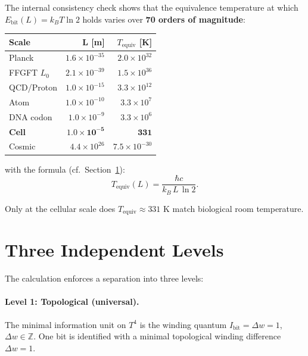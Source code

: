 The internal consistency check shows that the equivalence temperature
at which \(E_\text{bit}(L) = k_B T \ln 2\) holds
varies over \textbf{70 orders of magnitude}:

\begin{center}
\renewcommand{\arraystretch}{1.4}
\begin{tabular}{lrr}
\toprule
\textbf{Scale} & \textbf{L [m]} & \textbf{\(T_\text{equiv}\) [K]} \\
\midrule
Planck         & \(1.6 \times 10^{-35}\) & \(2.0 \times 10^{32}\) \\
FFGFT \(L_0\)  & \(2.1 \times 10^{-39}\) & \(1.5 \times 10^{36}\) \\
QCD/Proton     & \(1.0 \times 10^{-15}\) & \(3.3 \times 10^{12}\) \\
Atom           & \(1.0 \times 10^{-10}\) & \(3.3 \times 10^{7}\)  \\
DNA codon      & \(1.0 \times 10^{-9}\)  & \(3.3 \times 10^{6}\)  \\
\textbf{Cell}  & \(\mathbf{1.0 \times 10^{-5}}\) & \(\mathbf{331}\) \\
Cosmic         & \(4.4 \times 10^{26}\) & \(7.5 \times 10^{-30}\) \\
\bottomrule
\end{tabular}
\end{center}

with the formula (cf.\ Section~\ref{sec:three}):
\begin{equation}
  T_\text{equiv}(L) = \frac{\hbar c}{k_B \, L \, \ln 2}.
  \label{eq:Tequiv}
\end{equation}

Only at the cellular scale does \(T_\text{equiv} \approx 331\) K
match biological room temperature.

\section{Three Independent Levels}
\label{sec:three}

The calculation enforces a separation into three levels:

\paragraph{Level 1: Topological (universal).}

\begin{definition}
The minimal information unit on \(T^4\) is the winding quantum
\(I_\text{bit} = \Delta w = 1\), \(\Delta w \in \mathbb{Z}\).
One bit is identified with a minimal topological winding difference
\(\Delta w = 1\).
\end{definition}

